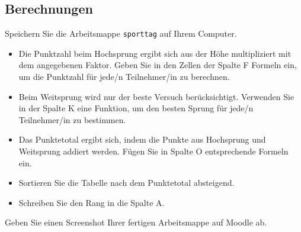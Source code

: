\subsection{Berechnungen}
\begin{myexercise}
    Speichern Sie die Arbeitsmappe \texttt{sporttag} auf Ihrem Computer.

    \begin{itemize}
        \item Die Punktzahl beim Hochsprung ergibt sich aus der Höhe multipliziert mit dem angegebenen Faktor. Geben Sie in den Zellen der Spalte F Formeln ein, um die Punktzahl für jede/n Teilnehmer/in zu berechnen.
        \item Beim Weitsprung wird nur der beste Versuch berücksichtigt. Verwenden Sie in der Spalte K eine Funktion, um den besten Sprung für jede/n Teilnehmer/in zu bestimmen.
        \item Das Punktetotal ergibt sich, indem die Punkte aus Hochsprung und Weitsprung addiert werden. Fügen Sie in Spalte O entsprechende Formeln ein.
        \item Sortieren Sie die Tabelle nach dem Punktetotal absteigend.
        \item Schreiben Sie den Rang in die Spalte A.
    \end{itemize}
    Geben Sie einen Screenshot Ihrer fertigen Arbeitsmappe auf Moodle ab.
\end{myexercise}


